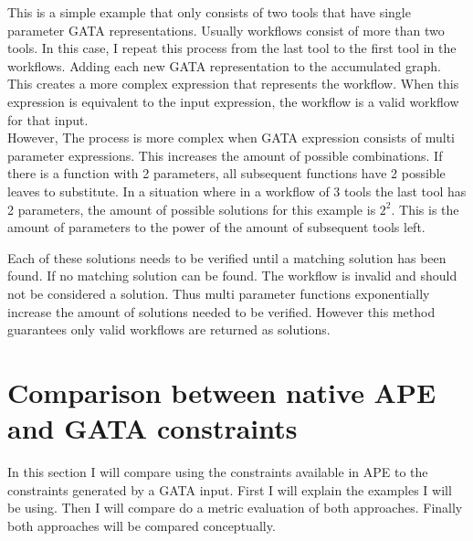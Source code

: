 \documentclass{article}
\begin{document}
This is a simple example that only consists of two tools that have single parameter GATA representations. Usually workflows consist of more than two tools. In this case, I repeat this process from the last tool to the first tool in the workflows. Adding each new GATA representation to the accumulated graph. This creates a more complex expression that represents the workflow. When this expression is equivalent to the input expression, the workflow is a valid workflow for that input. \\

However, The process is more complex when GATA expression consists of multi parameter expressions. This increases the amount of possible combinations. If there is a function with 2 parameters, all subsequent functions have 2 possible leaves to substitute. In a situation where in a workflow of 3 tools the last tool has 2 parameters, the amount of possible solutions for this example is $2^2$. This is the amount of parameters to the power of the amount of subsequent tools left.

Each of these solutions needs to be verified until a matching solution has been found. If no matching solution can be found. The workflow is invalid and should not be considered a solution. Thus multi parameter functions exponentially increase the amount of solutions needed to be verified. However this method guarantees only valid workflows are returned as solutions. 



\section{Comparison between native APE and GATA constraints}

In this section I will compare using the constraints available in APE to the constraints generated by a GATA input. First I will explain the examples I will be using. Then I will compare do a metric evaluation of both approaches. Finally both approaches will be compared conceptually. 
\end{document}
